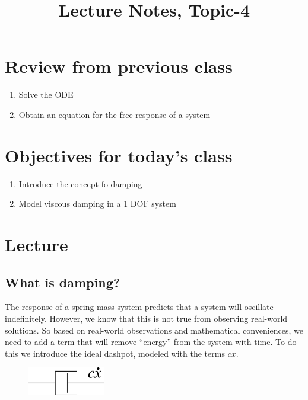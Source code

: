 \documentclass[12pt,a4paper]{article}
\begin{document}
	
	\large{}
	
	\title{\vspace{-2cm}Lecture Notes, Topic-4}
	\date{}
	\maketitle
	
	\section*{Review from previous class}
	\begin{enumerate}
		\item Solve the ODE
	\item Obtain an equation for the free response of a system
	\end{enumerate}
	
	\section*{Objectives for today's class}
	\begin{enumerate}
		\item Introduce the concept fo damping
		\item Model viscous damping in a 1 DOF system
	\end{enumerate}
	
	\section*{Lecture}
	
		\subsection*{What is damping?}
		
			The response of a spring-mass system predicts that a system will oscillate indefinitely. However, we know that this is not true from observing real-world solutions. So based on real-world observations and mathematical conveniences, we need to add a term that will remove ``energy'' from the system with time. To do this we introduce the ideal dashpot, modeled with the terms $c \dot{x}$.
			
			\begin{figure}[H]
				\centering
				\includegraphics[width=0.3\textwidth]{../../Figures/dashpot.png}
			\end{figure}
			
\end{document}
